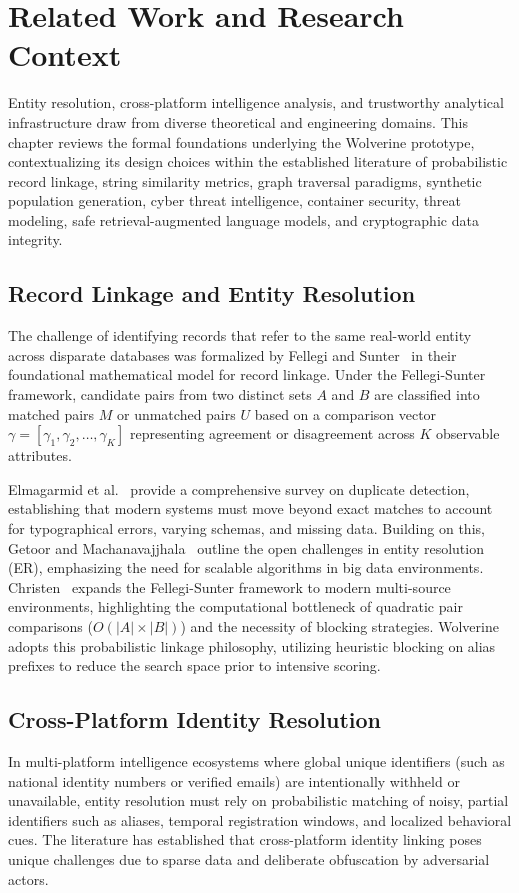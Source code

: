 \chapter{Related Work and Research Context}
\label{ch:related-work}

Entity resolution, cross-platform intelligence analysis, and trustworthy analytical infrastructure draw from diverse theoretical and engineering domains. This chapter reviews the formal foundations underlying the Wolverine prototype, contextualizing its design choices within the established literature of probabilistic record linkage, string similarity metrics, graph traversal paradigms, synthetic population generation, cyber threat intelligence, container security, threat modeling, safe retrieval-augmented language models, and cryptographic data integrity.

\section{Record Linkage and Entity Resolution}
\label{sec:related-record-linkage}
The challenge of identifying records that refer to the same real-world entity across disparate databases was formalized by Fellegi and Sunter~\cite{fellegi1969theory} in their foundational mathematical model for record linkage. Under the Fellegi-Sunter framework, candidate pairs from two distinct sets $A$ and $B$ are classified into matched pairs $M$ or unmatched pairs $U$ based on a comparison vector $\gamma = [\gamma_1, \gamma_2, \dots, \gamma_K]$ representing agreement or disagreement across $K$ observable attributes. 

Elmagarmid et al.~\cite{elmagarmid2007duplicate} provide a comprehensive survey on duplicate detection, establishing that modern systems must move beyond exact matches to account for typographical errors, varying schemas, and missing data. Building on this, Getoor and Machanavajjhala~\cite{getoor2012entity} outline the open challenges in entity resolution (ER), emphasizing the need for scalable algorithms in big data environments. Christen~\cite{christen2012data} expands the Fellegi-Sunter framework to modern multi-source environments, highlighting the computational bottleneck of quadratic pair comparisons ($O(|A| \times |B|)$) and the necessity of blocking strategies. Wolverine adopts this probabilistic linkage philosophy, utilizing heuristic blocking on alias prefixes to reduce the search space prior to intensive scoring. 

\section{Cross-Platform Identity Resolution}
\label{sec:related-identity-resolution}
In multi-platform intelligence ecosystems where global unique identifiers (such as national identity numbers or verified emails) are intentionally withheld or unavailable, entity resolution must rely on probabilistic matching of noisy, partial identifiers such as aliases, temporal registration windows, and localized behavioral cues. The literature has established that cross-platform identity linking poses unique challenges due to sparse data and deliberate obfuscation by adversarial actors.

